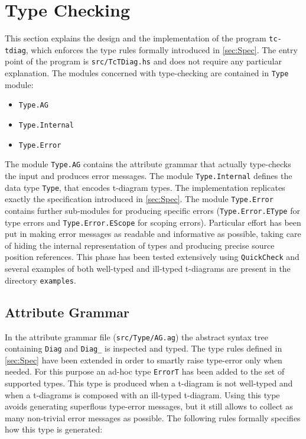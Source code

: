 \documentclass[12pt, a4paper, twoside]{article}
\begin{document}
\section{Type Checking}
This section explains the design and the implementation of the program \texttt{tc-tdiag}, which 
enforces the type rules formally introduced in \ref{sec:Spec}.
The entry point of the program is \texttt{src/TcTDiag.hs} and does not require any particular
explanation.
The modules concerned with type-checking are contained in \texttt{Type} module:
\begin{itemize}
  \item \texttt{Type.AG}
  \item \texttt{Type.Internal}
  \item \texttt{Type.Error}
\end{itemize}
The module \texttt{Type.AG} contains the attribute grammar that actually type-checks the input 
and produces error messages.
The module \texttt{Type.Internal} defines the data type \texttt{Type}, that encodes t-diagram types.
The implementation replicates exactly the specification introduced in \ref{sec:Spec}.
The module \texttt{Type.Error} contains further sub-modules for producing specific errors 
(\texttt{Type.Error.EType} for type errors and \texttt{Type.Error.EScope} for scoping errors).
Particular effort has been put in making error messages as readable and informative as possible,
taking care of hiding the internal representation of types and producing precise source
position references.
This phase has been tested extensively using \texttt{QuickCheck} and several examples of 
both well-typed and ill-typed t-diagrams are present in the directory \texttt{examples}.

\subsection{Attribute Grammar}
In the attribute grammar file (\texttt{src/Type/AG.ag}) the abstract syntax tree containing
\texttt{Diag} and \texttt{Diag\_} is inspected and typed.
The type rules defined in \ref{sec:Spec} have been extended in order to smartly raise type-error
only when needed. For this purpose an ad-hoc type \texttt{ErrorT} has been added to the set
 of supported types. This type is produced when a t-diagram is not well-typed and when
a t-diagrams is composed with an ill-typed t-diagram.
Using this type avoids generating superflous type-error messages, but it still allows to collect
as many non-trivial error messages as possible.
The following rules formally specifies how this type is generated:
\end{document}
